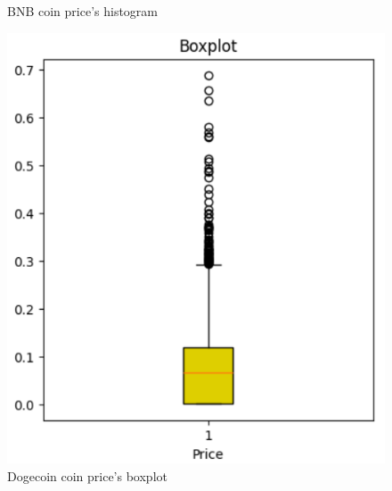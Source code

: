 \documentclass{ieeeojies}
\begin{document}
\begin{figure}[H]
\begin{minipage}{0.23\textwidth}
    \caption{BNB coin price's histogram}
    \label{fig:2}
  \end{minipage}
\end{figure}

\begin{figure}[H]
  \centering
  \begin{minipage}{0.23\textwidth}
    \centering
    \includegraphics[width=1\textwidth]{Image/Discriptive/boxplot_doge_new.png}
    \caption{Dogecoin coin price's boxplot}
    \label{fig:3}
  \end{minipage}
  \hfill
  \begin{minipage}{0.23\textwidth}
    \centering

\end{minipage}
\end{figure}
\end{document}
